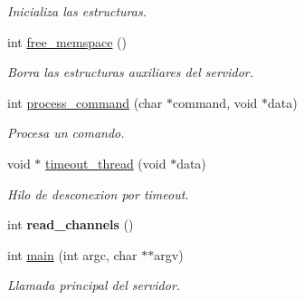 \begin{DoxyCompactItemize}
\begin{DoxyCompactList}\small\item\em Inicializa las estructuras. \end{DoxyCompactList}\item 
\hypertarget{G-2301-01-P1-irc__server_8c_a9d4a691668dc93686f563fbb475914a4}{}int \hyperlink{G-2301-01-P1-irc__server_8c_a9d4a691668dc93686f563fbb475914a4}{free\+\_\+memspace} ()\label{G-2301-01-P1-irc__server_8c_a9d4a691668dc93686f563fbb475914a4}

\begin{DoxyCompactList}\small\item\em Borra las estructuras auxiliares del servidor. \end{DoxyCompactList}\item 
int \hyperlink{G-2301-01-P1-irc__server_8c_a4368473e26707adc533f3b2288c1c707}{process\+\_\+command} (char $\ast$command, void $\ast$data)
\begin{DoxyCompactList}\small\item\em Procesa un comando. \end{DoxyCompactList}\item 
void $\ast$ \hyperlink{G-2301-01-P1-irc__server_8c_a99921717fca83a9d189862f57dc47b9f}{timeout\+\_\+thread} (void $\ast$data)
\begin{DoxyCompactList}\small\item\em Hilo de desconexion por timeout. \end{DoxyCompactList}\item 
\hypertarget{G-2301-01-P1-irc__server_8c_ad07e9f920658326d364140c1a0ec2ae4}{}int {\bfseries read\+\_\+channels} ()\label{G-2301-01-P1-irc__server_8c_ad07e9f920658326d364140c1a0ec2ae4}

\item 
int \hyperlink{G-2301-01-P1-irc__server_8c_a3c04138a5bfe5d72780bb7e82a18e627}{main} (int argc, char $\ast$$\ast$argv)
\begin{DoxyCompactList}\small\item\em Llamada principal del servidor. \end{DoxyCompactList}\end{DoxyCompactItemize}
